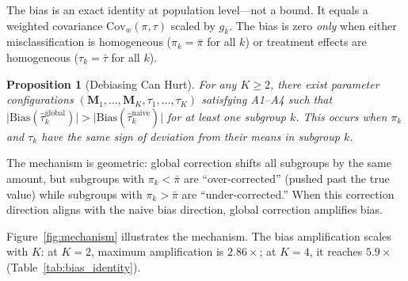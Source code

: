 \documentclass[11pt,twocolumn]{article}
\newtheorem{proposition}[theorem]{Proposition}
\theoremstyle{remark}
\newcommand{\Cov}{\mathrm{Cov}}
\newcommand{\Bias}{\mathrm{Bias}}
\newcommand{\abs}[1]{\lvert #1 \rvert}
\newcommand{\vect}[1]{\boldsymbol{#1}}
\begin{document}
The bias is an exact identity at population level---not a bound.
It equals a weighted covariance $\Cov_w(\pi, \tau)$ scaled by $g_k$.
The bias is zero \emph{only} when either misclassification is homogeneous ($\pi_k = \bar{\pi}$ for all $k$) or treatment effects are homogeneous ($\tau_k = \bar{\tau}$ for all $k$).

\begin{proposition}[Debiasing Can Hurt]\label{prop:hurt}
For any $K \geq 2$, there exist parameter configurations $(\vect{M}_1, \ldots, \vect{M}_K, \tau_1, \ldots, \tau_K)$ satisfying A1--A4 such that
$\abs{\Bias(\hat{\tau}_k^{\mathrm{global}})} > \abs{\Bias(\hat{\tau}_k^{\mathrm{naive}})}$
for at least one subgroup $k$.
This occurs when $\pi_k$ and $\tau_k$ have the same sign of deviation from their means in subgroup $k$.
\end{proposition}

The mechanism is geometric: global correction shifts all subgroups by the same amount, but subgroups with $\pi_k < \bar{\pi}$ are ``over-corrected'' (pushed past the true value) while subgroups with $\pi_k > \bar{\pi}$ are ``under-corrected.'' When this correction direction aligns with the naive bias direction, global correction amplifies bias.

Figure~\ref{fig:mechanism} illustrates the mechanism.
The bias amplification scales with $K$: at $K=2$, maximum amplification is $2.86\times$; at $K=4$, it reaches $5.9\times$ (Table~\ref{tab:bias_identity}).
\end{document}
